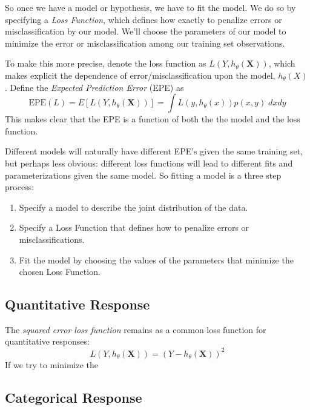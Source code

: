\documentclass[12pt]{article}
\begin{document}
So once we have a model or hypothesis, we have to fit
the model. We do so by specifying a \emph{Loss Function},
which defines how exactly to penalize errors or misclassification
by our model.  We'll choose the parameters of our model
to minimize the error or misclassification among our 
training set observations. 

To make this more precise, denote the loss function as
$L\left(Y, h_\theta(\mathbf{X})\right)$, which makes explicit the
dependence of error/misclassification upon the model, 
$h_\theta(X)$. 
Define the {\sl Expected Prediction Error} (EPE) as  
\begin{equation}
    \text{EPE}(L) = E\left[ L\left(Y, h_\theta(\mathbf{X})\right)\right] =
        \int L\left(y, h_\theta(x)\right) p(x, y) \; dx dy
\end{equation}
This makes clear that the EPE is a function of both the
the model and the loss function. 

Different models will naturally have different EPE's 
given the same training set, but perhaps less obvious:
different loss functions will lead to different fits
and parameterizations given the same model. So fitting
a model is a three step process:
\begin{enumerate}
    \item Specify a model to describe the joint
        distribution of the data.
    \item Specify a Loss Function that defines how
        to penalize errors or misclassifications.
    \item Fit the model by choosing the values of the
        parameters that minimize the chosen Loss Function.
\end{enumerate}

\subsection{Quantitative Response}

The \emph{squared error loss function} remains as a
common loss function for quantitative responses:
\begin{equation}
    \label{sqerror}
    L\left(Y, h_\theta(\mathbf{X})\right) = \left(Y - 
        h_\theta(\mathbf{X})\right)^2 
\end{equation}
If we try to minimize the 



\subsection{Categorical Response}
\end{document}
